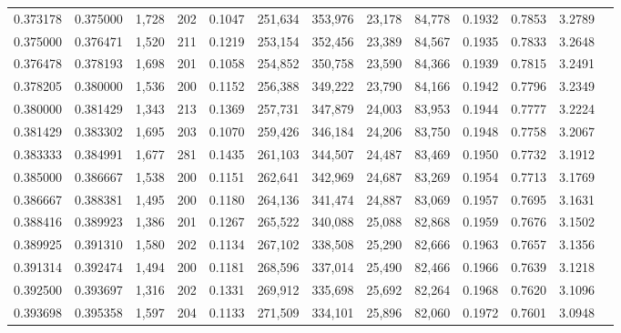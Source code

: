 \begin{tabular}{rrrrrrrrrrrrr}
0.373178 & 0.375000 &  1,728 &   202 &                                     0.1047 & 251,634 & 353,976 &  23,178 &  84,778 & 0.1932 & 0.7853 & 3.2789 \\
0.375000 & 0.376471 &  1,520 &   211 &                                     0.1219 & 253,154 & 352,456 &  23,389 &  84,567 & 0.1935 & 0.7833 & 3.2648 \\
0.376478 & 0.378193 &  1,698 &   201 &                                     0.1058 & 254,852 & 350,758 &  23,590 &  84,366 & 0.1939 & 0.7815 & 3.2491 \\
0.378205 & 0.380000 &  1,536 &   200 &                                     0.1152 & 256,388 & 349,222 &  23,790 &  84,166 & 0.1942 & 0.7796 & 3.2349 \\
0.380000 & 0.381429 &  1,343 &   213 &                                     0.1369 & 257,731 & 347,879 &  24,003 &  83,953 & 0.1944 & 0.7777 & 3.2224 \\
0.381429 & 0.383302 &  1,695 &   203 &                                     0.1070 & 259,426 & 346,184 &  24,206 &  83,750 & 0.1948 & 0.7758 & 3.2067 \\
0.383333 & 0.384991 &  1,677 &   281 &                                     0.1435 & 261,103 & 344,507 &  24,487 &  83,469 & 0.1950 & 0.7732 & 3.1912 \\
0.385000 & 0.386667 &  1,538 &   200 &                                     0.1151 & 262,641 & 342,969 &  24,687 &  83,269 & 0.1954 & 0.7713 & 3.1769 \\
0.386667 & 0.388381 &  1,495 &   200 &                                     0.1180 & 264,136 & 341,474 &  24,887 &  83,069 & 0.1957 & 0.7695 & 3.1631 \\
0.388416 & 0.389923 &  1,386 &   201 &                                     0.1267 & 265,522 & 340,088 &  25,088 &  82,868 & 0.1959 & 0.7676 & 3.1502 \\
0.389925 & 0.391310 &  1,580 &   202 &                                     0.1134 & 267,102 & 338,508 &  25,290 &  82,666 & 0.1963 & 0.7657 & 3.1356 \\
0.391314 & 0.392474 &  1,494 &   200 &                                     0.1181 & 268,596 & 337,014 &  25,490 &  82,466 & 0.1966 & 0.7639 & 3.1218 \\
0.392500 & 0.393697 &  1,316 &   202 &                                     0.1331 & 269,912 & 335,698 &  25,692 &  82,264 & 0.1968 & 0.7620 & 3.1096 \\
0.393698 & 0.395358 &  1,597 &   204 &                                     0.1133 & 271,509 & 334,101 &  25,896 &  82,060 & 0.1972 & 0.7601 & 3.0948 \\

\end{tabular}
